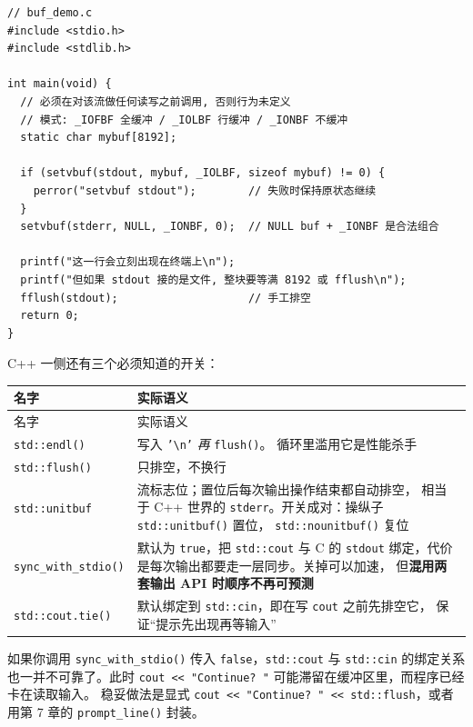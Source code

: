 \documentclass[12pt,a4paper,fontset=fandol]{ctexbook}
\newcommand{\Fn}[1]{\texttt{#1()}}
\newcommand{\Tp}[1]{\texttt{#1}}
\begin{document}
\begin{lstlisting}[caption={setvbuf 的三种模式与正确调用时机}]
// buf_demo.c
#include <stdio.h>
#include <stdlib.h>

int main(void) {
  // 必须在对该流做任何读写之前调用, 否则行为未定义
  // 模式: _IOFBF 全缓冲 / _IOLBF 行缓冲 / _IONBF 不缓冲
  static char mybuf[8192];

  if (setvbuf(stdout, mybuf, _IOLBF, sizeof mybuf) != 0) {
    perror("setvbuf stdout");        // 失败时保持原状态继续
  }
  setvbuf(stderr, NULL, _IONBF, 0);  // NULL buf + _IONBF 是合法组合

  printf("这一行会立刻出现在终端上\n");
  printf("但如果 stdout 接的是文件, 整块要等满 8192 或 fflush\n");
  fflush(stdout);                    // 手工排空
  return 0;
}
\end{lstlisting}

C++ 一侧还有三个必须知道的开关：

\begin{longtable}{@{}>{\raggedright\arraybackslash}p{}
                 >{\raggedright\arraybackslash}p{}@{}}
\toprule
名字 & 实际语义 \\
\midrule
\endfirsthead
\toprule
名字 & 实际语义 \\
\midrule
\endhead
\Fn{std::endl} & 写入 \Tp{'\textbackslash n'} \emph{再} \Fn{flush}。
循环里滥用它是性能杀手 \\
\Fn{std::flush} & 只排空，不换行 \\
\Tp{std::unitbuf} & 流标志位；置位后每次输出操作结束都自动排空，
相当于 C++ 世界的 \Tp{stderr}。开关成对：操纵子 \Fn{std::unitbuf} 置位，
\Fn{std::nounitbuf} 复位 \\
\Fn{sync\_with\_stdio} & 默认为 \Tp{true}，把 \Tp{std::cout} 与 C 的
\Tp{stdout} 绑定，代价是每次输出都要走一层同步。关掉可以加速，
但\textbf{混用两套输出 API 时顺序不再可预测} \\
\Fn{std::cout.tie} & 默认绑定到 \Tp{std::cin}，即在写 \Tp{cout} 之前先排空它，
保证``提示先出现再等输入'' \\
\bottomrule
\end{longtable}

\begin{note}[title={为什么 \Tp{cin} 之后的提示语有时不显示}]
如果你调用 \Fn{sync\_with\_stdio} 传入 \Tp{false}，\Tp{std::cout} 与
\Tp{std::cin} 的绑定关系也一并不可靠了。此时
\lstinline|cout << "Continue? "| 可能滞留在缓冲区里，而程序已经卡在读取输入。
稳妥做法是显式
\lstinline|cout << "Continue? " << std::flush|，或者用第 7 章的
\Fn{prompt\_line} 封装。
\end{note}
\end{document}
